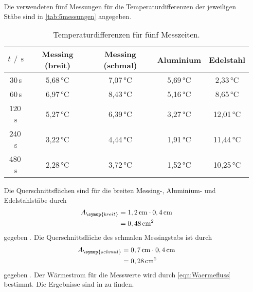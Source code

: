 Die verwendeten fünf Messungen für die Temperaturdifferenzen der jeweiligen Stäbe sind in \autoref{tab:5messungen} angegeben.
\begin{table}[h]
  \centering
  \caption{Temperaturdifferenzen für fünf Messzeiten.}
  \label{tab:5messungen}
  \begin{tabular}{c c c c c}
    \toprule
    $t\,\mathbin{/}\,\si{\second}$ & Messing (breit) & Messing (schmal) & Aluminium & Edelstahl \\
    \midrule
     30\,\si{\second} & 5,68\,\si{\celsius} & 7,07\,\si{\celsius} & 5,69\,\si{\celsius} & 2,33\,\si{\celsius} \\
     60\,\si{\second} & 6,97\,\si{\celsius} & 8,43\,\si{\celsius} & 5,16\,\si{\celsius} & 8,65\,\si{\celsius} \\
    120\,\si{\second} & 5,27\,\si{\celsius} & 6,39\,\si{\celsius} & 3,27\,\si{\celsius} & 12,01\,\si{\celsius} \\
    240\,\si{\second} & 3,22\,\si{\celsius} & 4,44\,\si{\celsius} & 1,91\,\si{\celsius} & 11,44\,\si{\celsius} \\
    480\,\si{\second} & 2,28\,\si{\celsius} & 3,72\,\si{\celsius} & 1,52\,\si{\celsius} & 10,25\,\si{\celsius} \\
    \bottomrule
  \end{tabular}
\end{table}

Die Querschnittsflächen sind für die breiten Messing-, Aluminium- und Edelstahlstäbe durch
\begin{align*}
  A_{\symup{breit}} &= 1,2\,\si{\centi\meter}\cdot 0,4\,\si{\centi\meter} \\
                    &= 0,48\,\si{\centi\meter^2}
\end{align*}
gegeben \cite{sample}. Die Querschnittsfläche des schmalen Messingstabs ist durch
\begin{align*}
  A_{\symup{schmal}} &= 0,7\,\si{\centi\meter}\cdot 0,4\,\si{\centi\meter} \\
                     &= 0,28\,\si{\centi\meter^2}
\end{align*}
gegeben \cite{sample}.
Der Wärmestrom für die Messwerte wird durch \autoref{eqn:Waermefluss} bestimmt. Die Ergebnisse sind in zu finden.

